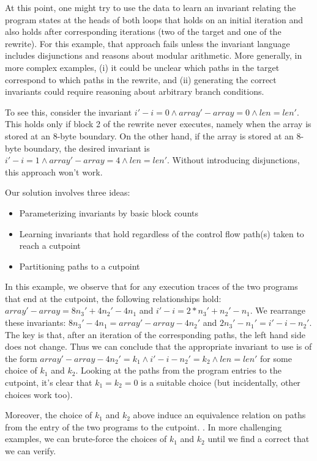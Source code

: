 At this point, one might try to use the data to learn an invariant
relating the program states at the heads of both loops that holds on
an initial iteration and also holds after corresponding iterations
(two of the target and one of the rewrite).  For this example, that approach fails unless the
invariant language includes disjunctions and reasons about modular
arithmetic. More generally, in more complex examples, (i) it could be
unclear which paths in the target correspond to which paths in the
rewrite, and (ii) generating the correct invariants could require
reasoning about arbitrary branch conditions.

To see this, consider the invariant $i' - i = 0 \wedge array' - array
= 0 \wedge len = len'$. This holds only if block 2 of the rewrite
never executes, namely when the array is stored at an 8-byte boundary.
On the other hand, if the array is stored at an 8-byte boundary, the
desired invariant is $i' - i = 1 \wedge array' - array = 4 \wedge len
= len'$. Without introducing disjunctions, this approach won't work.

Our solution involves three ideas:

\begin{itemize}
\item Parameterizing invariants by basic block counts
\item Learning invariants that hold regardless of the control flow path(s) taken to reach a cutpoint
\item Partitioning paths to a cutpoint 
\end{itemize}

In this example, we observe that for any execution traces of the two
programs that end at the cutpoint, the following relationships hold:
$array' - array = 8n_3' + 4n_2' - 4n_1$ and $i' - i = 2*n_3' + n_2' -
n_1$. We rearrange these invariants: $8n_3' - 4n_1 = array' - array
- 4n_2'$ and $2n_3' - n_1' = i' - i - n_2'$. The key is that, after
an iteration of the corresponding paths, the left hand side does not
change. Thus we can conclude that the appropriate invariant to use is
of the form $array' - array - 4n_2' = k_1 \wedge i' - i - n_2' = k_2
\wedge len = len'$ for some choice of $k_1$ and $k_2$. Looking at the
paths from the program entries to the cutpoint, it's clear that $k_1
= k_2 = 0$ is a suitable choice (but incidentally, other choices work
too).

Moreover, the choice of $k_1$ and $k_2$ above induce an equivalence
relation on paths from the entry of the two programs to the cutpoint.
. In more challenging examples, we
can brute-force the choices of $k_1$ and $k_2$ until we find a correct
\bisimrep{} that we can verify.

